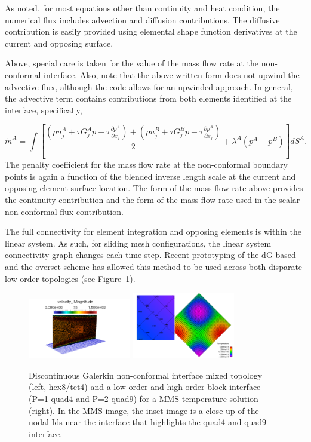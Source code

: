 As noted, for most equations other than continuity and heat condition, the numerical flux includes advection and 
diffusion contributions. The diffusive contribution is easily provided using elemental shape function derivatives 
at the current and opposing surface. 

Above, special care is taken for the value of the mass flow rate at the non-conformal interface. Also,
note that the above written form does not upwind the advective flux, although the code allows for an upwinded 
approach. In general, the advective term contains contributions from both elements identified at the interface, 
specifically,

\begin{equation} 
        \dot {m}^A = \int [\frac{(\rho u_j^A + \tau G_j^A p -\tau \frac{\partial p^A}{\partial x_j}) 
        				       + (\rho u_j^B+ \tau G_j^B p -\tau \frac{\partial p^A}{\partial x_j})}{2}
				       + \lambda^A ( p^A - p^B)] dS^A.
\label{mdotA}
\end{equation}
The penalty coefficient for the mass flow rate at the non-conformal boundary points is again a function of the 
blended inverse length scale at the current and opposing element surface location. The form of the mass flow 
rate above provides the continuity contribution and the form of the mass flow rate used in the scalar non-conformal
flux contribution.

The full connectivity for element integration and opposing elements is within the linear 
system. As such, for sliding mesh configurations, the linear system connectivity graph changes each time step. Recent prototyping of 
the dG-based and the overset scheme has allowed this method to be used across both disparate low-order 
topologies (see Figure~\ref{dgMixMatch}).

\begin{figure}[h!tp]
\centering
\includegraphics[clip,width=0.4\textwidth]{images/dgHex8Tet4Duct.png}
\includegraphics[clip,width=0.4\textwidth]{images/dgQuad4Quad9MMS.png}
\caption{Discontinuous Galerkin non-conformal interface mixed topology (left, hex8/tet4) and a low-order and high-order block interface 
(P=1 quad4 and P=2 quad9) for a MMS temperature solution (right). In the MMS image, the inset image is a close-up of the nodal 
Ids near the interface that highlights the quad4 and quad9 interface.}
\label{dgMixMatch}
\end{figure}
